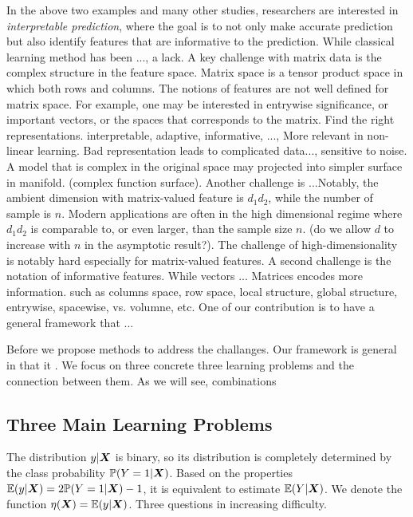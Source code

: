 \documentclass[12pt]{article}
\begin{document}
In the above two examples and many other studies, researchers are interested in \emph{interpretable prediction}, where the goal is to not only make accurate prediction but also identify features that are informative to the prediction. While classical learning method has been ..., a lack. A key challenge with matrix data is the complex structure in the feature space. Matrix space is a tensor product space in which both rows and columns. The notions of features are not well defined for matrix space. For example, one may be interested in entrywise significance, or important vectors, or the spaces that corresponds to the matrix. Find the right representations. interpretable, adaptive, informative, ..., More relevant in non-linear learning. Bad representation leads to complicated data..., sensitive to noise. A model that is complex in the original space may projected into simpler surface in manifold. (complex function surface). 
Another challenge is ...Notably, the ambient dimension with matrix-valued feature is $d_1d_2$, while the number of sample is $n$. Modern applications are often in the high dimensional regime where $d_1d_2$ is comparable to, or even larger, than the sample size $n$. (do we allow $d$ to increase with $n$ in the asymptotic result?). The challenge of high-dimensionality is notably hard especially for matrix-valued features. A second challenge is the notation of informative features. While vectors ... Matrices encodes more information. such as columns space, row space, local structure, global structure, entrywise, spacewise, vs. volumne, etc. One of our contribution is to have a general framework that ...

Before we propose methods to address the challanges. Our framework is general in that it . We focus on three concrete three learning problems and the connection between them. As we will see, combinations

\subsection{Three Main Learning Problems}
The distribution $y|\bm X$ is binary, so its distribution is completely determined by the class probability $\mathbb{P}(Y=1|\bm X)$. Based on the properties $\mathbb{E}(y|\bm X) = 2\mathbb{P}(Y=1|\bm X)-1$, it is equivalent to estimate $\mathbb{E}(Y|\bm X)$. We denote the function $\eta(\bm X)=\mathbb{E}(y|\bm X)$. Three questions in increasing difficulty.

\end{document}

